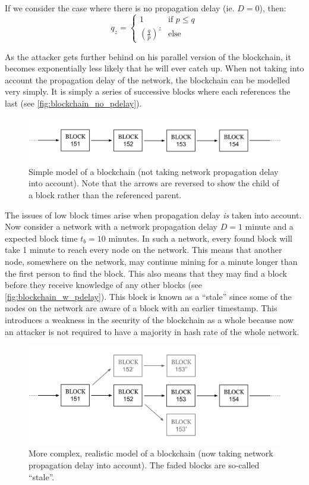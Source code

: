 \documentclass{article}
\begin{document}
If we consider the case where there is no propagation delay (ie. $D = 0$), then:
\[
q_z = 
\begin{cases}
    1                           &\textrm{if } p \leq q \\
    \left(\frac{q}{p}\right)^z  &\textrm{else}
\end{cases}
\]

As the attacker gets further behind on his parallel version of the blockchain, it becomes exponentially less likely that he will ever catch up. When not taking into account the propagation delay of the network, the blockchain can be modelled very simply. It is simply a series of successive blocks where each references the last (see \autoref{fig:blockchain_no_pdelay}).
\begin{figure}[h]
    \centering
    \includegraphics[width=0.9\linewidth]{Images/Diagrams/blockchain_no_pdelay.png}
    \caption{Simple model of a blockchain (not taking network propagation delay into account). Note that the arrows are reversed to show the child of a block rather than the referenced parent.}
    \label{fig:blockchain_no_pdelay}
\end{figure}

The issues of low block times arise when propagation delay \emph{is} taken into account. Now consider a network with a network propagation delay $D = 1$ minute and a expected block time $t_b = 10$ minutes. In such a network, every found block will take 1 minute to reach every node on the network. This means that another node, somewhere on the network, may continue mining for a minute longer than the first person to find the block. This also means that they may find a block before they receive knowledge of any other blocks (see \autoref{fig:blockchain_w_pdelay}). This block is known as a ``stale'' since some of the nodes on the network are aware of a block with an earlier timestamp. This introduces a weakness in the security of the blockchain as a whole because now an attacker is not required to have a majority in hash rate of the whole network.

\begin{figure}[h]
    \centering
    \includegraphics[width=0.9\linewidth]{Images/Diagrams/blockchain_with_pdelay.png}
    \caption{More complex, realistic model of a blockchain (now taking network propagation delay into account). The faded blocks are so-called ``stale''.}
    \label{fig:blockchain_w_pdelay}
\end{figure}
\end{document}
